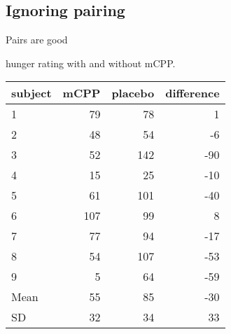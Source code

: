 \subsection{Ignoring pairing}
\begin{frame}{Pairs are good}

     hunger rating with and without mCPP.
    \begin{center}
      \begin{tabular}{lrrr}
        \hline
        subject & mCPP & placebo & difference \\ 
        \hline
        1 & 79 & 78 & 1 \\ 
        2 & 48 & 54 & -6 \\ 
        3 & 52 & 142 & -90 \\ 
        4 & 15 & 25 & -10 \\ 
        5 & 61 & 101 & -40 \\ 
        6 & 107 & 99 & 8 \\ 
        7 & 77 & 94 & -17 \\ 
        8 & 54 & 107 & -53 \\ 
        9 & 5 & 64 & -59 \\ 
        \hline
         Mean & 55 & 85 & -30 \\ 
         SD & 32 & 34 & 33 \\ 
         \hline
      \end{tabular}
    \end{center}
\end{frame}


